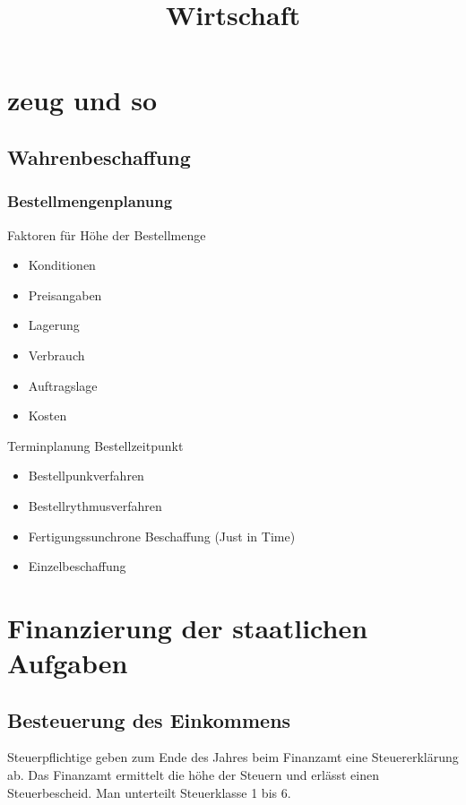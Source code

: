 \documentclass{scrartcl}
\title{Wirtschaft}
\begin{document}
\maketitle

\tableofcontents

\section{zeug und so}
\subsection{Wahrenbeschaffung}
\subsubsection{Bestellmengenplanung}

Faktoren für Höhe der Bestellmenge

\begin{itemize}
	\item
		Konditionen
	\item
		Preisangaben
	\item
		Lagerung
	\item
		Verbrauch
	\item
		Auftragslage
	\item
		Kosten
\end{itemize}

Terminplanung Bestellzeitpunkt

\begin{itemize}
	\item
		Bestellpunkverfahren
	\item
		Bestellrythmusverfahren
	\item
		Fertigungssunchrone Beschaffung (Just in Time)
	\item
		Einzelbeschaffung
\end{itemize}

\section{Finanzierung der staatlichen Aufgaben}
\subsection{Besteuerung des Einkommens}

Steuerpflichtige geben zum Ende des Jahres beim Finanzamt eine Steuererklärung ab.
Das Finanzamt ermittelt die höhe der Steuern und erlässt einen Steuerbescheid.
Man unterteilt Steuerklasse 1 bis 6.
\end{document}
